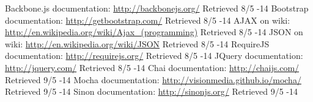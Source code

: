  Backbone.js documentation: \url{http://backbonejs.org/} Retrieved 8/5 -14 
 Bootstrap documentation: \url{http://getbootstrap.com/} Retrieved 8/5 -14 
 AJAX on wiki: \url{http://en.wikipedia.org/wiki/Ajax_(programming)} Retrieved 8/5 -14 
 JSON on wiki: \url{ http://en.wikipedia.org/wiki/JSON} Retrieved 8/5 -14 
 RequireJS documentation: \url{http://requirejs.org/} Retrieved 8/5 -14 
 JQuery documentation: \url{http://jquery.com/}  Retrieved 8/5 -14 
 Chai documentation: \url{http://chaijs.com/} Retrieved 9/5 -14 
 Mocha documentation: \url{http://visionmedia.github.io/mocha/} Retrieved 9/5 -14 
 Sinon documentation: \url{http://sinonjs.org/} Retrieved 9/5 -14 